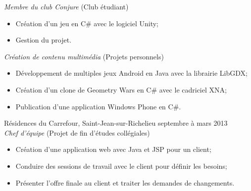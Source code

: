 \documentclass{res}
\begin{document}
\begin{resume}
{	{\sl Membre du club Conjure} \hfill (Club étudiant)
	\vspace{0.05in}
	\begin{itemize} \itemsep -2pt
		\item Création d’un jeu en C\# avec le logiciel Unity;
		\item Gestion du projet.
	\end{itemize}


	{\sl Création de contenu multimédia} \hfill (Projets personnels)
	\vspace{0.05in}
	\begin{itemize} \itemsep -2pt
		\item Développement de multiples jeux Android en Java avec la librairie LibGDX;
		\item Création d’un clone de Geometry Wars en C\# avec le cadriciel XNA;
		\item Publication d’une application Windows Phone en C\#.
	\end{itemize}

	Résidences du Carrefour, Saint-Jean-sur-Richelieu
	\hfill septembre à mars 2013 \\
	{\sl Chef d'équipe} \hfill (Projet de fin d'études collégiales)
	\vspace{0.05in}

	\begin{itemize} \itemsep -2pt
		\item Création d’une application web avec Java et JSP pour un client;
		\item Conduire des sessions de travail avec le client pour définir les besoins;
		\item Présenter l’offre finale au client et traiter les demandes de changements.
	\end{itemize}

}


\end{resume}
\end{document}
